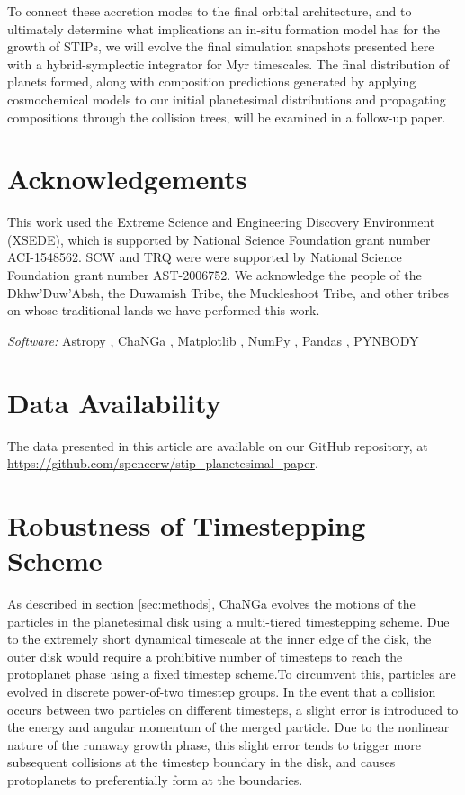 \documentclass[twocolumn,linenumbers]{aastex63}
\begin{document}
To connect these accretion modes to the final orbital architecture,
and to ultimately determine what implications an in-situ formation model has for the growth of STIPs, we will evolve the final 
simulation snapshots presented here with a hybrid-symplectic integrator for Myr timescales. The final distribution of planets 
formed, along with composition predictions generated by applying cosmochemical models to our initial planetesimal distributions 
and propagating compositions through the collision trees, will be examined in a follow-up paper.

\section*{Acknowledgements}
This work used the Extreme Science and Engineering Discovery Environment (XSEDE), which is supported by National Science Foundation grant number ACI-1548562. SCW and TRQ were were supported by National Science Foundation grant number AST-2006752. We acknowledge the people of the Dkhw’Duw’Absh, the Duwamish Tribe, the Muckleshoot Tribe, and other tribes on whose traditional lands we have performed this work.

\textit{Software:} Astropy \citep{astropy13}, {\sc ChaNGa} \citep{jetley08, menon15}, Matplotlib 
\citep{matplotlib07}, NumPy \citep{numpy11}, Pandas \citep{pandas10}, {\sc PYNBODY} \citep{pynbody13}

\section*{Data Availability}
The data presented in this article are available on our GitHub repository, at \url{https://github.com/spencerw/stip_planetesimal_paper}.

\appendix
\section{Robustness of Timestepping Scheme}\label{sec:rung_ecc}

As described in section \ref{sec:methods}, {\sc ChaNGa} evolves the motions of the particles in the planetesimal disk using a multi-tiered timestepping scheme. Due to the extremely short dynamical timescale at the inner edge of the disk, the outer disk would require a prohibitive number of timesteps to reach the protoplanet phase using a fixed timestep scheme.To circumvent this, particles are evolved in discrete power-of-two timestep groups. In the event that a collision occurs between two particles on different timesteps, a slight error is introduced to the energy and angular momentum of the merged particle. Due to the nonlinear nature of the runaway growth phase, this slight error tends to trigger more subsequent collisions at the timestep boundary in the disk, and causes protoplanets to preferentially form at the boundaries.
\end{document}
